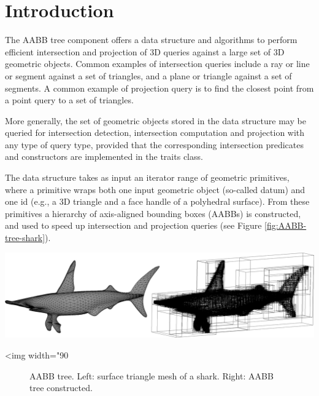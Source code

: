 \section{Introduction}
\label{AABB_tree_section_intro}

The AABB tree component offers a data structure and algorithms to perform efficient intersection and projection of 3D queries against a large set of 3D geometric objects. Common examples of intersection queries include a ray or line or segment against a set of triangles, and a plane or triangle against a set of segments. A common example of projection query is to find the closest point from a point query to a set of triangles.

More generally, the set of geometric objects stored in the data structure may be queried for intersection detection, intersection computation and projection with any type of query type, provided that the corresponding intersection predicates and constructors are implemented in the traits class. 

The data structure takes as input an iterator range of geometric primitives, where a primitive wraps both one input geometric object (so-called datum) and one id (e.g., a 3D triangle and a face handle of a polyhedral surface). From these primitives a hierarchy of axis-aligned bounding boxes (AABBs) is constructed, and used to speed up intersection and projection queries (see Figure \ref{fig:AABB-tree-shark}). 

\begin{center}
    \label{fig:AABB-tree-shark}
    \begin{ccTexOnly}
      \includegraphics[width=1.0\textwidth]{AABB_tree/shark}
    \end{ccTexOnly}
    \begin{ccHtmlOnly}
        <img width="90%
    \end{ccHtmlOnly}
    \begin{figure}[h]
        \caption{AABB tree.
                 Left: surface triangle mesh of a shark.
                 Right: AABB tree constructed.}
    \end{figure}
\end{center}

